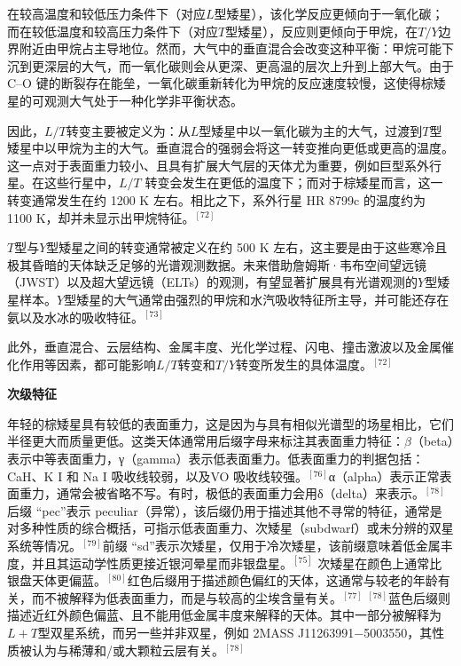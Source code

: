在较高温度和较低压力条件下（对应$L$型矮星），该化学反应更倾向于一氧化碳；而在较低温度和较高压力条件下（对应$T$型矮星），反应则更倾向于甲烷，在$T/Y$边界附近由甲烷占主导地位。然而，大气中的垂直混合会改变这种平衡：甲烷可能下沉到更深层的大气，而一氧化碳则会从更深、更高温的层次上升到上部大气。由于 C–O 键的断裂存在能垒，一氧化碳重新转化为甲烷的反应速度较慢，这使得棕矮星的可观测大气处于一种化学非平衡状态。

因此，$L/T$转变主要被定义为：从$L$型矮星中以一氧化碳为主的大气，过渡到$T$型矮星中以甲烷为主的大气。垂直混合的强弱会将这一转变推向更低或更高的温度。这一点对于表面重力较小、且具有扩展大气层的天体尤为重要，例如巨型系外行星。在这些行星中，$L/T$ 转变会发生在更低的温度下；而对于棕矮星而言，这一转变通常发生在约 1200 K 左右。相比之下，系外行星 HR 8799c 的温度约为 1100 K，却并未显示出甲烷特征。$^{[72]}$

$T$型与$Y$型矮星之间的转变通常被定义在约 500 K 左右，这主要是由于这些寒冷且极其昏暗的天体缺乏足够的光谱观测数据。未来借助詹姆斯·韦布空间望远镜（JWST）以及超大望远镜（ELTs）的观测，有望显著扩展具有光谱观测的$Y$型矮星样本。$Y$型矮星的大气通常由强烈的甲烷和水汽吸收特征所主导，并可能还存在氨以及水冰的吸收特征。$^{[73]}$

此外，垂直混合、云层结构、金属丰度、光化学过程、闪电、撞击激波以及金属催化作用等因素，都可能影响$L/T$转变和$T/Y$转变所发生的具体温度。$^{[72]}$

\textbf{次级特征}

年轻的棕矮星具有较低的表面重力，这是因为与具有相似光谱型的场星相比，它们半径更大而质量更低。这类天体通常用后缀字母来标注其表面重力特征：$\beta$（beta）表示中等表面重力，γ（gamma）表示低表面重力。低表面重力的判据包括：CaH、K I 和 Na I 吸收线较弱，以及VO 吸收线较强。$^{[76]}$α（alpha）表示正常表面重力，通常会被省略不写。有时，极低的表面重力会用δ（delta）来表示。$^{[78]}$后缀 “pec”表示 peculiar（异常），该后缀仍用于描述其他不寻常的特征，通常是对多种性质的综合概括，可指示低表面重力、次矮星（subdwarf）或未分辨的双星系统等情况。$^{[79]}$前缀 “sd”表示次矮星，仅用于冷次矮星，该前缀意味着低金属丰度，并且其运动学性质更接近银河晕星而非银盘星。$^{[75]}$ 次矮星在颜色上通常比银盘天体更偏蓝。$^{[80]}$红色后缀用于描述颜色偏红的天体，这通常与较老的年龄有关，而不被解释为低表面重力，而是与较高的尘埃含量有关。$^{[77]}$ $^{[78]}$蓝色后缀则描述近红外颜色偏蓝、且不能用低金属丰度来解释的天体。其中一部分被解释为$L+T$型双星系统，而另一些并非双星，例如 2MASS J11263991−5003550，其性质被认为与稀薄和/或大颗粒云层有关。$^{[78]}$
